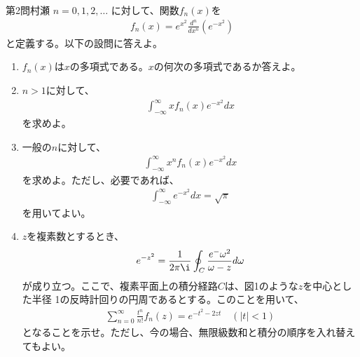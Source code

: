 \begin{question}{第2問}{村瀬}
$n=0,1,2,\ldots$ に対して、関数$f_n(x)$を
\begin{align*}
  f_n(x) = e^{x^2} \frac{d^n}{dx^n}(e^{-x^2})
\end{align*}
と定義する。以下の設問に答えよ。
\begin{enumerate}
\item
  $f_n(x)$は$x$の多項式である。$x$の何次の多項式であるか答えよ。

\item
  $n>1$に対して、
  \begin{align*}
    \int_{-\infty}^{\infty} x f_n(x) e^{-x^2}dx
  \end{align*}
  を求めよ。

\item
  一般の$n$に対して、
  \begin{align*}
    \int_{-\infty}^{\infty} x^n f_n(x) e^{-x^2} dx
  \end{align*}
  を求めよ。ただし、必要であれば、
  \begin{align*}
    \int_{-\infty}^{\infty} e^{-x^2}dx = \sqrt{\pi}
  \end{align*}
  を用いてよい。

\item{}
  $z$を複素数とするとき、
  \begin{align*}
    e^{-z^2} = \frac1{2\pi\i}\oint_C\frac{e^-\omega^2}{\omega-z}d\omega
  \end{align*}
  が成り立つ。ここで、複素平面上の積分経路$C$は、図1のような$z$を中心とした半径
  1の反時計回りの円周であるとする。このことを用いて、
  \begin{align*}
    \sum_{n=0}^\infty \frac{t^n}{n!} f_n(z) = e^{-t^2-2zt}\quad(|t|<1)
  \end{align*}
  となることを示せ。ただし、今の場合、無限級数和と積分の順序を入れ替えてもよい。


\end{enumerate}
\end{question}
